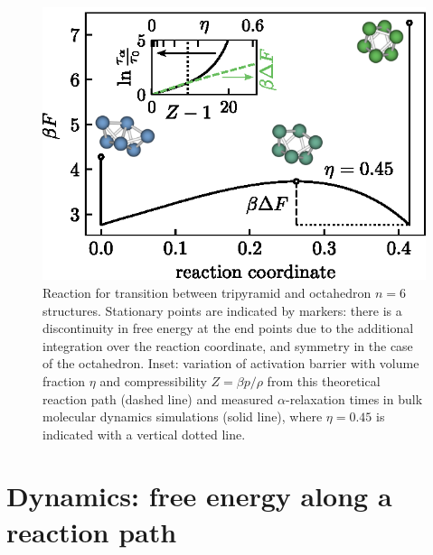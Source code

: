 \documentclass[11pt,twoside]{report}
\begin{document}
\begin{figure}
  \includegraphics[width=0.9\linewidth,outer]{n6-reaction-path}
  \caption[The simplest nontrivial reaction path in hard spheres: octahedron to tripyramid]{
    Reaction for transition between tripyramid and octahedron $n = 6$ structures.
    Stationary points are indicated by markers: there is a discontinuity in free energy at the end points due to the additional integration over the reaction coordinate, and symmetry in the case of the octahedron.
    Inset: variation of activation barrier with volume fraction $\eta$ and compressibility $Z = \beta p/\rho$ from this theoretical reaction path (dashed line) and measured $\alpha$-relaxation times in bulk molecular dynamics simulations (solid line), where $\eta = 0.45$ is indicated with a vertical dotted line.
  }
  \label{fig:reaction-path-6}
\end{figure}


\section{Dynamics: free energy along a reaction path}
\end{document}

